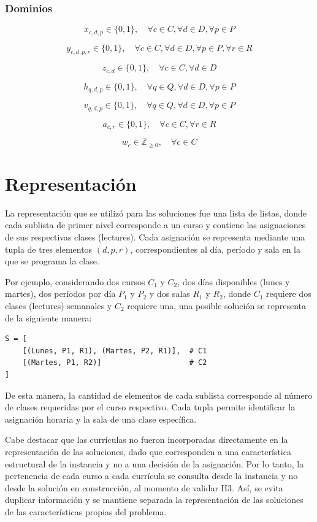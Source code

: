 \documentclass[letter, 10pt]{article}
\begin{document}
\subsubsection{Dominios}
\[
x_{c,d,p} \in \{0,1\}, \quad \forall c \in C, \forall d \in D, \forall p \in P
\]

\[
y_{c,d,p,r} \in \{0,1\}, \quad \forall c \in C, \forall d \in D, \forall p \in P, \forall r \in R
\]

\[
z_{c,d} \in \{0,1\}, \quad \forall c \in C, \forall d \in D
\]

\[
h_{q,d,p} \in \{0,1\}, \quad \forall q \in Q, \forall d \in D, \forall p \in P
\]

\[
v_{q,d,p} \in \{0,1\}, \quad \forall q \in Q, \forall d \in D, \forall p \in P
\]

\[
a_{c,r} \in \{0,1\}, \quad \forall c \in C, \forall r \in R
\]

\[
w_c \in \mathbb{Z}_{\geq 0}, \quad \forall c \in C
\]
\section{Representaci\'on}
La representaci\'on que se utiliz\'o para las soluciones fue una lista de listas, donde cada sublista de primer nivel corresponde a un curso y contiene las asignaciones de sus respectivas clases (lectures). Cada asignaci\'on se representa mediante una tupla de tres elementos $(d, p, r)$, correspondientes al d\'ia, per\'iodo y sala en la que se programa la clase.

Por ejemplo, considerando dos cursos $C_1$ y $C_2$, dos d\'ias disponibles (lunes y martes), dos per\'iodos por d\'ia $P_1$ y $P_2$ y dos salas $R_1$ y $R_2$, donde $C_1$ requiere dos clases (lectures) semanales y $C_2$ requiere una, una posible soluci\'on se representa de la siguiente manera:

\begin{verbatim}
S = [
    [(Lunes, P1, R1), (Martes, P2, R1)],  # C1
    [(Martes, P1, R2)]                    # C2
]
\end{verbatim}

De esta manera, la cantidad de elementos de cada sublista corresponde al n\'umero de clases requeridas por el curso respectivo. Cada tupla permite identificar la asignaci\'on horaria y la sala de una clase espec\'ifica.

Cabe destacar que las curr\'iculas no fueron incorporadas directamente en la representaci\'on de las soluciones, dado que corresponden a una caracter\'istica estructural de la instancia y no a una decisi\'on de la asignaci\'on. Por lo tanto, la pertenencia de cada curso a cada curr\'icula se consulta desde la instancia y no desde la soluci\'on en construcci\'on, al momento de validar H3. As\'i, se evita duplicar informaci\'on y se mantiene separada la representaci\'on de las soluciones de las caracter\'isticas propias del problema.
\end{document}

